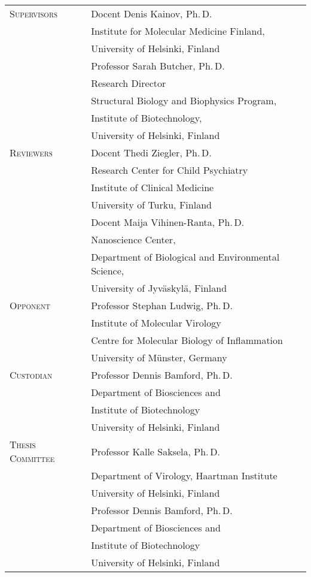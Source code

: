 \documentclass[a4paper,12pt]{article} %
\begin{document}
\begin{singlespace}
	\begin{tabular}{p{4.5cm}l}
		\textsc{Supervisors} & Docent Denis Kainov, Ph.\,D.\\
		& Institute for Molecular Medicine Finland,\\
		& University of Helsinki, Finland \\
	\rule[0.6 cm]{0pt}{0pt}	& Professor Sarah Butcher, Ph.\,D.\\
		& Research Director \\
		& Structural Biology and Biophysics Program,\\
		& Institute of Biotechnology,\\
		& University of Helsinki, Finland\\
	\rule[1 cm]{0pt}{0pt}	\textsc{Reviewers} & Docent Thedi Ziegler, Ph.\,D. \\
		& Research Center for Child Psychiatry \\
	    & Institute of Clinical Medicine \\ 
	    & University of Turku, Finland \\
	\rule[0.6 cm]{0pt}{0pt}	& Docent Maija Vihinen-Ranta, Ph.\,D. \\
		& Nanoscience Center, \\
		& Department of  Biological and Environmental Science, \\
		& University of Jyv\"{a}skyl\"{a}, Finland \\
	\rule[1 cm]{0pt}{0pt}	\textsc{Opponent} & Professor Stephan Ludwig, Ph.\,D. \\
		& Institute of Molecular Virology \\
		& Centre for Molecular Biology of Inflammation \\
		& University of M\"{u}nster, Germany \\
	\rule[1 cm]{0pt}{0pt}	
	\textsc{Custodian} & Professor Dennis Bamford, Ph.\,D. \\
		& Department of Biosciences and \\
		& Institute of Biotechnology \\
		& University of Helsinki, Finland \\
	\rule[1 cm]{0pt}{0pt} \textsc{Thesis Committee} & Professor Kalle Saksela, Ph.\,D. \\
		& Department of Virology, Haartman Institute \\
		& University of Helsinki, Finland \\
	\rule[0.6 cm]{0pt}{0pt}	& Professor Dennis Bamford, Ph.\,D. \\
		& Department of Biosciences and \\
		& Institute of Biotechnology \\
		& University of Helsinki, Finland\\
	\end{tabular} 


\end{singlespace}
\end{document}
